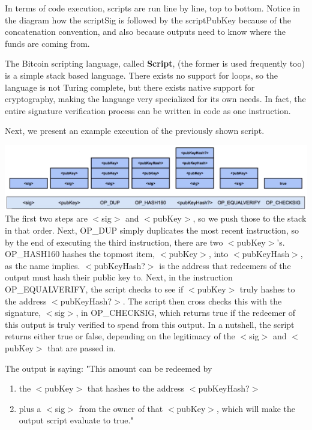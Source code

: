 \documentclass[11pt]{article}
\begin{document}
  In terms of code execution, scripts are run line by line, top to bottom. Notice in the diagram how the scriptSig is followed by the scriptPubKey because of the concatenation convention, and also because outputs need to know where the funds are coming from. 
  
  The Bitcoin scripting language, called \textbf{Script}, (the former is used frequently too) is a simple stack based language. There exists no support for loops, so the language is not Turing complete, but there exists native support for cryptography, making the language very specialized for its own needs. In fact, the entire signature verification process can be written in code as one instruction.
  
  Next, we present an example execution of the previously shown script. 

\includegraphics[scale=0.2]{script_execution} \\

 The first two steps are $<$sig$>$ and $<$pubKey$>$, so we push those to the stack in that order. Next, OP\_DUP simply duplicates the most recent instruction, so by the end of executing the third instruction, there are two $<$pubKey$>$'s. OP\_HASH160 hashes the topmost item, $<$pubKey$>$, into $<$pubKeyHash$>$, as the name implies. $<$pubKeyHash?$>$ is the address that redeemers of the output must hash their public key to. Next, in the instruction OP\_EQUALVERIFY, the script checks to see if $<$pubKey$>$ truly hashes to the address $<$pubKeyHash?$>$. The script then cross checks this with the signature, $<$sig$>$, in OP\_CHECKSIG, which returns true if the redeemer of this output is truly verified to spend from this output. In a nutshell, the script returns either true or false, depending on the legitimacy of the $<$sig$>$ and $<$pubKey$>$ that are passed in. 
 
 The output is saying: "This amount can be redeemed by
 \begin{enumerate}
     \item the $<$pubKey$>$ that hashes to the address $<$pubKeyHash?$>$
     \item plus a $<$sig$>$ from the owner of that $<$pubKey$>$, which will make the output script evaluate to true."
 \end{enumerate}
 
\end{document}
